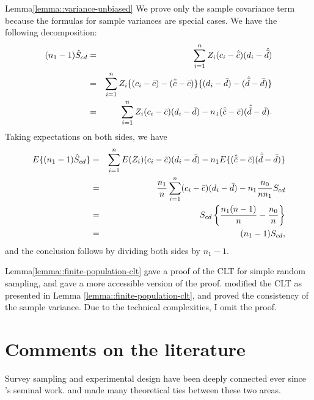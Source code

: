 \begin{myproof}{Lemma}{\ref{lemma::variance-unbiased}} 
We prove only the sample covariance term because the formulas for sample variances are special cases.
We have the following decomposition:
\begin{eqnarray*}
(n_1 - 1)  \hat{S}_{cd}  &=& \sum_{i=1}^n Z_i  (c_i -  \hat{\bar{c}} ) (d_i -  \hat{\bar{d}}  ) \\
&=& \sum_{i=1}^n Z_i \{    (c_i -  \bar{c}  ) - (  \hat{\bar{c}}   -  \bar{c} )  \}  \{    (d_i -  \bar{d}   ) - (  \hat{\bar{d}}    -  \bar{d}  )  \}\\
&=&\sum_{i=1}^n Z_i    (c_i -  \bar{c}  ) (d_i -  \bar{d}   )  -  n_1(  \hat{\bar{c}}   -  \bar{c} )   (  \hat{\bar{d}}    -  \bar{d}  ).
\end{eqnarray*}
Taking expectations on both sides, we have
\begin{eqnarray*}
E\{ (n_1 - 1)  \hat{S}_{cd}  \} &=&   \sum_{i=1}^n E(Z_i)    (c_i -  \bar{c}  )  (d_i -  \bar{d}   )   -  n_1 E\{ (  \hat{\bar{c}}   -  \bar{c} )   (  \hat{\bar{d}}    -  \bar{d}  ) \} \\
&=& \frac{n_1}{n}  \sum_{i=1}^n     (c_i -  \bar{c}  ) (d_i -  \bar{d}   ) - n_1 \frac{n_0}{nn_1} S_{cd} \\
&=& S_{cd} \left\{   \frac{n_1(n-1)}{n} - \frac{n_0}{n} \right\} \\
&=& (n_1 - 1) S_{cd},
\end{eqnarray*}
and the conclusion follows by dividing both sides by $n_1-1$. 
\end{myproof}





\begin{myproof}{Lemma}{\ref{lemma::finite-population-clt}}
\citet{hajek1960limiting} gave a proof of the CLT for simple random sampling, and \citet{lehmann2006nonparametrics} gave a more accessible version of the proof. \citet{li2017general} modified the CLT as presented in Lemma \ref{lemma::finite-population-clt}, and proved the consistency of the sample variance. Due to the technical complexities, I omit the proof. 
\end{myproof}



\section{Comments on the literature}


Survey sampling and experimental design have been deeply connected ever since \citet{neyman1934two, neyman1935statistical}'s seminal work. \citet{li2017general} and \citet{mukerjee2018using} made many theoretical ties between these two areas. 



